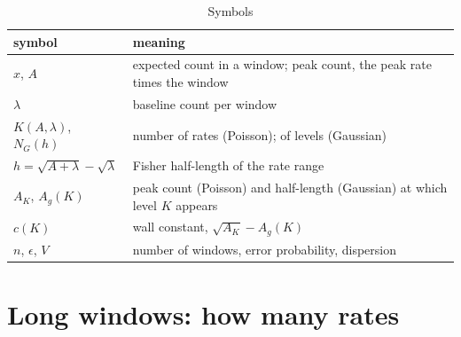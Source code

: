 \documentclass[journal]{IEEEtran}
\begin{document}
\begin{table}[t]\centering\caption{Symbols}\label{tab:symbols}
\footnotesize
\begin{tabular}{@{}p{}p{}@{}}\toprule
symbol & meaning\\\midrule
$x$, $A$ & expected count in a window; peak count, the peak rate times the window\\
$\lambda$ & baseline count per window\\
$K(A, \lambda)$, $N_G(h)$ & number of rates (Poisson); of levels (Gaussian)\\
$h = \sqrt{A + \lambda} - \sqrt\lambda$ & Fisher half-length of the rate range\\
$A_K$, $A_g(K)$ & peak count (Poisson) and half-length (Gaussian) at which level $K$ appears\\
$c(K)$ & wall constant, $\sqrt{A_K} - A_g(K)$\\
$n$, $\epsilon$, $V$ & number of windows, error probability, dispersion\\
\bottomrule\end{tabular}
\end{table}

\section{Long windows: how many rates}\label{sec:long}
\end{document}
